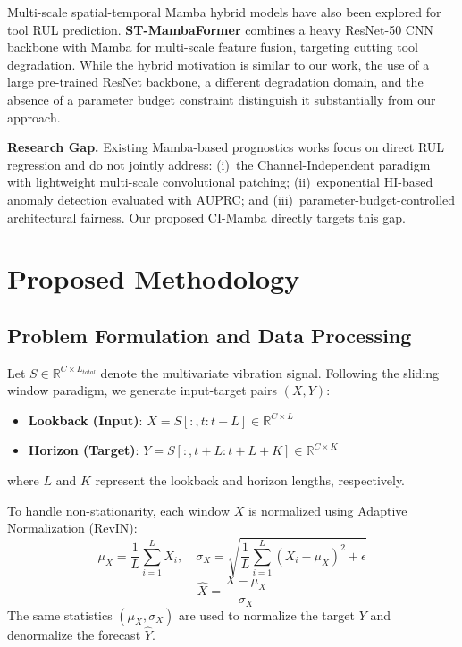 \documentclass{ieeeaccess}
\begin{document}
{Multi-scale spatial-temporal Mamba hybrid models have also been explored for tool RUL prediction. \textbf{ST-MambaFormer} \cite{zhu2025stmambaformer} combines a heavy ResNet-50 CNN backbone with Mamba for multi-scale feature fusion, targeting cutting tool degradation. While the hybrid motivation is similar to our work, the use of a large pre-trained ResNet backbone, a different degradation domain, and the absence of a parameter budget constraint distinguish it substantially from our approach.

\textbf{Research Gap.} Existing Mamba-based prognostics works focus on direct RUL regression and do not jointly address: (i)~the Channel-Independent paradigm with lightweight multi-scale convolutional patching; (ii)~exponential HI-based anomaly detection evaluated with AUPRC; and (iii)~parameter-budget-controlled architectural fairness. Our proposed CI-Mamba directly targets this gap.

\section{Proposed Methodology}
\label{sec:methodology}

\subsection{Problem Formulation and Data Processing}
\label{sec:problem_formulation}

Let $S \in \mathbb{R}^{C \times L_{total}}$ denote the multivariate vibration signal. Following the sliding window paradigm, we generate input-target pairs $(X, Y)$:
\begin{itemize}
    \item \textbf{Lookback (Input)}: $X = S[:, t:t+L] \in \mathbb{R}^{C \times L}$
    \item \textbf{Horizon (Target)}: $Y = S[:, t+L:t+L+K] \in \mathbb{R}^{C \times K}$
\end{itemize}
where $L$ and $K$ represent the lookback and horizon lengths, respectively.

To handle non-stationarity, each window $X$ is normalized using Adaptive Normalization (RevIN):
\begin{equation}
    \mu_X = \frac{1}{L} \sum_{i=1}^L X_i, \quad \sigma_X = \sqrt{\frac{1}{L} \sum_{i=1}^L (X_i - \mu_X)^2 + \epsilon}
\end{equation}
\begin{equation}
    \hat{X} = \frac{X - \mu_X}{\sigma_X}
\end{equation}
The same statistics $(\mu_X, \sigma_X)$ are used to normalize the target $Y$ and denormalize the forecast $\hat{Y}$.

}
\end{document}
